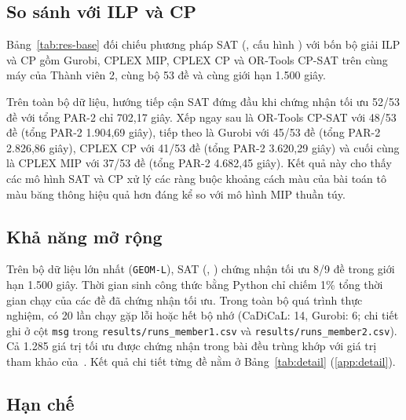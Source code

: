 \subsection{So sánh với ILP và CP}\label{sec:exp-compare}

Bảng~\ref{tab:res-base} đối chiếu phương pháp SAT (\BestSolver{}, cấu hình \BestConfig{}) với bốn bộ giải ILP và CP gồm Gurobi, CPLEX MIP, CPLEX CP và OR-Tools CP-SAT trên cùng máy của Thành viên 2, cùng bộ 53 đề và cùng giới hạn 1.500 giây.

Trên toàn bộ dữ liệu, hướng tiếp cận SAT đứng đầu khi chứng nhận tối ưu 52/53 đề với tổng PAR-2 chỉ 702,17 giây. Xếp ngay sau là OR-Tools CP-SAT với 48/53 đề (tổng PAR-2 1.904,69 giây), tiếp theo là Gurobi với 45/53 đề (tổng PAR-2 2.826,86 giây), CPLEX CP với 41/53 đề (tổng PAR-2 3.620,29 giây) và cuối cùng là CPLEX MIP với 37/53 đề (tổng PAR-2 4.682,45 giây). Kết quả này cho thấy các mô hình SAT và CP xử lý các ràng buộc khoảng cách màu của bài toán tô màu băng thông hiệu quả hơn đáng kể so với mô hình MIP thuần túy.

\begin{table}[width=\linewidth,pos=t]
\caption{SAT so với ILP và CP: số đề chứng nhận tối ưu / tổng số đề (PAR-2, giây).}
\label{tab:res-base}
\centering\small

\end{table}

\subsection{Khả năng mở rộng}\label{sec:exp-scale}

Trên bộ dữ liệu lớn nhất (\texttt{GEOM-L}), SAT (\BestSolver{}, \BestConfig{}) chứng nhận tối ưu 8/9 đề trong giới hạn 1.500 giây. Thời gian sinh công thức bằng Python chỉ chiếm 1\% tổng thời gian chạy của các đề đã chứng nhận tối ưu. Trong toàn bộ quá trình thực nghiệm, có 20 lần chạy gặp lỗi hoặc hết bộ nhớ (CaDiCaL: 14, Gurobi: 6; chi tiết ghi ở cột \texttt{msg} trong \texttt{results/runs\_member1.csv} và \texttt{results/runs\_member2.csv}). Cả 1.285 giá trị tối ưu được chứng nhận trong bài đều trùng khớp với giá trị tham khảo của~\citet{nguyen2026bcp}. Kết quả chi tiết từng đề nằm ở Bảng~\ref{tab:detail} (\ref{app:detail}).

\subsection{Hạn chế}\label{sec:threats}

